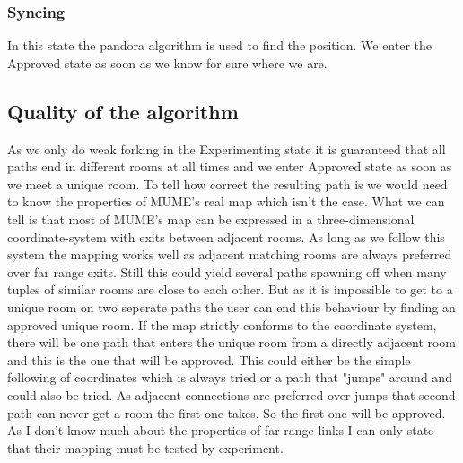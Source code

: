 \documentclass[11pt]{article}
\begin{document}
\subsubsection{Syncing}
In this state the pandora algorithm is used to find the position. We enter the Approved state as
soon as we know for sure where we are.


\subsection{Quality of the algorithm}
As we only do weak forking in the Experimenting state it is guaranteed that all paths end in different rooms at all times 
and we enter Approved state as soon as we meet a unique room. To tell how correct the resulting path is we would need 
to know the properties of MUME's real map which isn't the case. What we can tell is that most of MUME's map can be
expressed in a three-dimensional coordinate-system with exits between adjacent rooms. As long as we follow this system
the mapping works well as adjacent matching rooms are always preferred over far range exits. Still this could yield several 
paths spawning off when many tuples of similar rooms are close to each other. But as it is impossible to get to a unique room 
on two seperate paths the user can end this behaviour by finding an approved unique room. If the map strictly conforms to the
coordinate system, there will be one path that enters the unique room from a directly adjacent room and this is the one that will be approved.
This could either be the simple following of coordinates which is always tried or a path that "jumps" around and could also be tried. 
As adjacent connections are preferred over jumps that second path can never get a room the first one takes. So the first one will be approved.
As I don't know much about the properties of far range links I can only state that their mapping must be tested by experiment.
\end{document}

